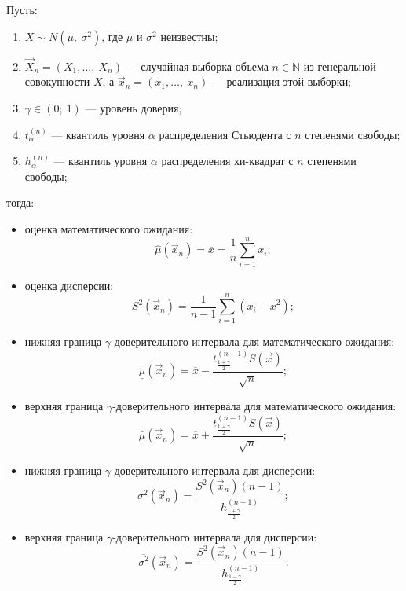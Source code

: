 Пусть:
\begin{enumerate}
    \item \( X \sim N(\mu,\ \sigma^2) \), где  \( \mu \) и \( \sigma^2 \) неизвестны;
    \item \( \vec{X}_n = (X_1, \ldots,\ X_n) \) --- случайная выборка объема \( n \in \mathbb{N} \)
    из генеральной совокупности \( X \), а \( \vec{x}_n = (x_1, \ldots,\ x_n) \) --- реализация этой
    выборки;
    \item \( \gamma \in  (0;\ 1) \) --- уровень доверия;
    \item \( t_\alpha^{(n)} \) --- квантиль уровня \( \alpha \) распределения Стьюдента с \( n \) 
    степенями свободы;
    \item \( h_\alpha^{(n)} \) --- квантиль уровня \( \alpha \) распределения хи-квадрат с \( n \) 
    степенями свободы;
\end{enumerate}
тогда:
\begin{itemize}
    \item оценка математического ожидания: 
    \begin{equation*}
        \hat{\mu}(\vec{x}_n) = \overline{x} = \frac{1}{n}\sum_{i=1}^n x_i;   
    \end{equation*}
    \item оценка дисперсии: 
    \begin{equation*}
        S^2(\vec{x}_n) = \frac{1}{n-1}\sum_{i=1}^n (x_i - \overline{x}^2 );   
    \end{equation*}
    \item нижняя граница \( \gamma \)-доверительного интервала для математического ожидания:
    \begin{equation*}
        \underline{\mu}(\vec{x}_n) = \overline{x} - \frac{t_{\frac{1+\gamma}{2}}^{(n-1)}S(\vec{x})}{\sqrt{n}};
    \end{equation*} 
    \item верхняя граница \( \gamma \)-доверительного интервала для математического ожидания:
    \begin{equation*}
        \overline{\mu}(\vec{x}_n) = \overline{x} + \frac{t_{\frac{1+\gamma}{2}}^{(n-1)}S(\vec{x})}{\sqrt{n}};
    \end{equation*} 
    \item нижняя граница \( \gamma \)-доверительного интервала для дисперсии:
    \begin{equation*}
        \underline{\sigma^2}(\vec{x}_n) = \frac{S^2(\vec{x}_n)(n-1)}{h_{\frac{1+\gamma}{2}}^{(n-1)}};
    \end{equation*} 
    \item верхняя граница \( \gamma \)-доверительного интервала для дисперсии:
    \begin{equation*}
        \overline{\sigma^2}(\vec{x}_n) = \frac{S^2(\vec{x}_n)(n-1)}{h_{\frac{1-\gamma}{2}}^{(n-1)}}.
    \end{equation*} 
\end{itemize}
